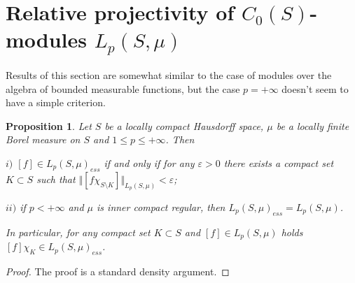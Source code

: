 \documentclass[12pt]{article}
\newtheorem{proposition}[theorem]{Proposition}
\begin{document}

\section{Relative projectivity of \texorpdfstring{$C_0(S)$}{C0S}-modules \texorpdfstring{$L_p(S,\mu)$}{LpSmu}}
\label{SectionRelativeProjectivityOfC0SModulesLpSmu}

Results of this section are somewhat similar to the case of modules over the algebra of bounded measurable functions, but the case $p=+\infty$ doesn't seem to have a simple criterion.

\begin{proposition}\label{LpEssC0ModCharac} Let $S$ be a locally compact Hausdorff space, $\mu$ be a locally finite Borel measure on $S$ and $1\leq p\leq+\infty$. Then

    $i)$ $[f]\in L_p(S,\mu)_{ess}$ if and only if for any $\varepsilon >0$ there exists a compact set $K\subset S$ such that $\Vert [f\chi_{S\setminus K}]\Vert_{L_p(S,\mu)}< \varepsilon$;

    $ii)$ if $p<+\infty$ and $\mu$ is inner compact regular, then $L_p(S,\mu)_{ess}=L_p(S,\mu)$.

    In particular, for any compact set $K\subset S$ and $[f]\in L_p(S,\mu)$ holds $[f]\chi_K\in L_p(S,\mu)_{ess}$.
\end{proposition}
\begin{proof} The proof is a standard density argument.
\end{proof}
\end{document}
